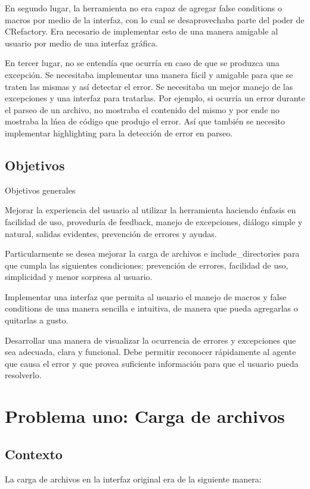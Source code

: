 \documentclass[a4paper,oneside,10pt]{article}
\begin{document}
En segundo lugar, la herramienta no era capaz de agregar false conditions o macros por medio de la interfaz, con lo cual se desaprovechaba  parte del poder de CRefactory. Era necesario de implementar esto de una manera amigable al usuario por medio de una interfaz gr\'afica.

En tercer lugar, no se entend\'ia que ocurr\'ia en caso de que se produzca una excepci\'on. Se necesitaba implementar una manera f\'acil y amigable para que se traten las mismas y as\'i detectar el error. Se necesitaba un mejor manejo de las excepciones y una interfaz para tratarlas.
Por ejemplo, si ocurr\'ia un error durante el parseo de un archivo, no mostraba el contenido del mismo y por ende no mostraba la l\'nea de c\'odigo que produjo el error. As\'i que tambi\'en se necesito implementar highlighting para la detecci\'on de error en parseo.


\subsection{Objetivos}
Objetivos generales

Mejorar la experiencia del usuario al utilizar la herramienta haciendo \'enfasis en facilidad de uso, provedur\'ia de feedback, manejo de excepciones, di\'alogo simple y natural, salidas evidentes, prevenci\'on de errores y ayudas.

Particularmente se desea mejorar la carga de archivos e include\_directories para que cumpla las siguientes condiciones: prevenci\'on de errores, facilidad de uso, simplicidad y menor sorpresa al usuario.

Implementar una interfaz que permita al usuario el manejo de macros y false conditions de una manera sencilla e intuitiva, de manera que pueda agregarlas o quitarlas a gusto.

Desarrollar una manera de visualizar la ocurrencia de errores y excepciones que sea adecuada, clara y funcional. Debe permitir reconocer r\'apidamente al agente que causa el error y que provea suficiente informaci\'on para que el usuario pueda resolverlo.

\section{Problema uno: Carga de archivos}

\subsection{Contexto}
La carga de archivos en la interfaz original era de la siguiente manera:
\end{document}
